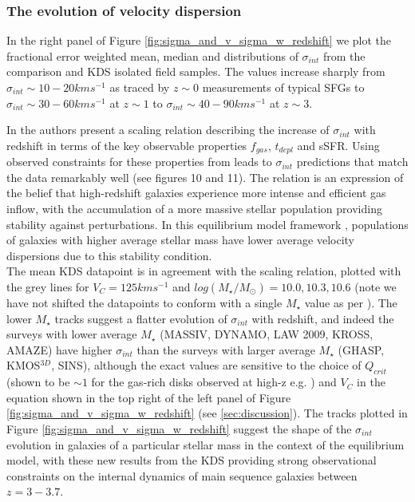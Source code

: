 \documentclass[fleqn,usenatbib]{mn2e}
\begin{document}
\subsubsection{The evolution of velocity dispersion}\label{subsubsec:sigma_evolution}

In the right panel of Figure \ref{fig:sigma_and_v_sigma_w_redshift} we plot the fractional error weighted mean, median and distributions of $\sigma_{int}$ from the comparison and KDS isolated field samples.
The values increase sharply from $\sigma_{int} \sim 10-20kms^{-1}$ as traced by $z\sim0$ measurements of typical SFGs to $\sigma_{int} \sim 30-60kms^{-1}$ at $z\sim1$ to $\sigma_{int} \sim 40-90kms^{-1}$ at $z\sim3$.

In \cite{Wisnioski2015} the authors present a scaling relation describing the increase of $\sigma_{int}$ with redshift in terms of the key observable properties $f_{gas}$, $t_{depl}$ and sSFR.
Using observed constraints for these properties from \cite{Tacconi2013} leads to $\sigma_{int}$ predictions that match the data remarkably well (see \cite{Wisnioski2015} figures 10 and 11).
The relation is an expression of the belief that high-redshift galaxies experience more intense and efficient gas inflow, with the accumulation of a more massive stellar population providing stability against perturbations.
In this equilibrium model framework \citep[e.g.][]{Dave2012,Lilly2013,Saintonge2013}, populations of galaxies with higher average stellar mass have lower average velocity dispersions due to this stability condition.  \\

The mean KDS datapoint is in agreement with the scaling relation, plotted with the grey lines for $V_{C} = 125kms^{-1}$ and $log(M_{\star}/M_{\odot})=10.0,10.3,10.6$ (note we have not shifted the datapoints to conform with a single $M_{\star}$ value as per \cite{Wisnioski2015}).
The lower $M_{\star}$ tracks suggest a flatter evolution of $\sigma_{int}$ with redshift, and indeed the surveys with lower average $M_{\star}$ (MASSIV, DYNAMO, LAW 2009, KROSS, AMAZE) have higher $\sigma_{int}$ than the surveys with larger average $M_{\star}$ (GHASP, KMOS$^{3D}$, SINS), although the exact values are sensitive to the choice of $Q_{crit}$ (shown to be $\sim1$ for the gas-rich disks observed at high-z e.g. \citealt{ForsterSchreiber2006,Genzel2011,Newman2013}) and $V_{C}$ in the equation shown in the top right of the left panel of Figure \ref{fig:sigma_and_v_sigma_w_redshift} (see \cref{sec:discussion}).
The tracks plotted in Figure \ref{fig:sigma_and_v_sigma_w_redshift} suggest the shape of the $\sigma_{int}$ evolution in galaxies of a particular stellar mass in the context of the equilibrium model, with these new results from the KDS providing strong observational constraints on the internal dynamics of main sequence galaxies between $z=3-3.7$.
\end{document}
